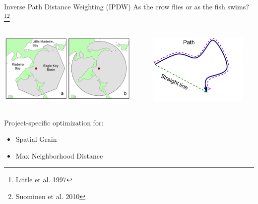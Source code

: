 \documentclass[compress,noflama,nosectionpages]{beamer}
\begin{document}
\begin{frame}{Inverse Path Distance Weighting (IPDW)}
	As the crow flies or as the fish swims?\footnote{Little et al. 1997}\footnote[frame]{Suominen et al. 2010}
	\vspace{6pt}
 	\begin{columns}
   	\begin{column}{6.8cm}
     	\includegraphics[width=6.8cm,keepaspectratio=true,clip=true,trim= 0mm 0mm 0mm 0mm]{figures/sm-figure1.png}
 		\end{column}

 		\begin{column}{5.4cm}
     	\includegraphics[width=4.8cm,keepaspectratio=true]{images/Picture1.png}
   	\end{column}
 \end{columns}
	Project-specific optimization for:
	\begin{itemize}
		\item{Spatial Grain}
		\item{Max Neighborhood Distance}
	\end{itemize}
	\vspace{4pt}
\end{frame}
\end{document}
